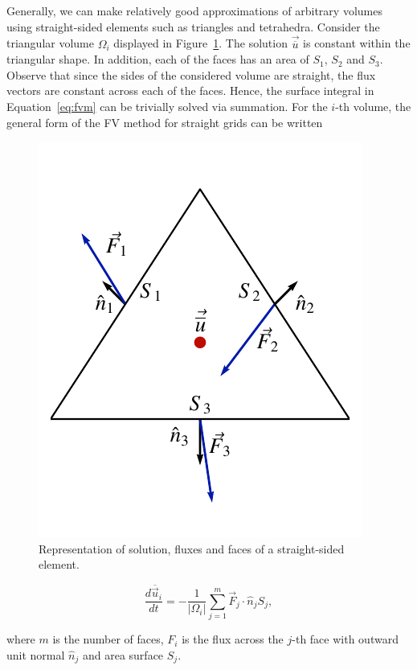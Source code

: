 Generally, we can make relatively good approximations of arbitrary volumes using straight-sided elements such as triangles and tetrahedra. Consider the triangular volume $\Omega_i$ displayed in Figure~\ref{fig:fv_straightsided}. The solution $\vec{\overline u}$ is constant within the triangular shape. In addition, each of the faces has an area of $S_1$, $S_2$ and $S_3$. Observe that since the sides of the considered volume are straight, the flux vectors are constant across each of the faces. Hence, the surface integral in Equation~\ref{eq:fvm} can be trivially solved via summation. For the $i$-th volume, the general form of the FV method for straight grids can be written
\begin{figure}[htbp]
 \centering
 \includegraphics[width=0.3\linewidth]{Pictures/ch11_fv_cellavg}
 \caption{Representation of solution, fluxes and faces of a straight-sided element.}
 \label{fig:fv_straightsided}
\end{figure}
\begin{eqBox}
 \begin{equation}
 \frac{d \overline{\vec u}_i}{dt} = - \frac{1}{|\Omega_i|} \sum_{j=1}^{m} \vec F_j \cdot \hat n_j S_j,
 \label{eq:fv_straightsided}
 \end{equation}
\end{eqBox}
where $m$ is the number of faces, $F_i$ is the flux across the $j$-th face with outward unit normal $\hat n_j$ and area surface $S_j$.


